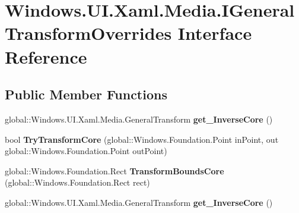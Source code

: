 \hypertarget{interface_windows_1_1_u_i_1_1_xaml_1_1_media_1_1_i_general_transform_overrides}{}\section{Windows.\+U\+I.\+Xaml.\+Media.\+I\+General\+Transform\+Overrides Interface Reference}
\label{interface_windows_1_1_u_i_1_1_xaml_1_1_media_1_1_i_general_transform_overrides}
\subsection*{Public Member Functions}
\begin{DoxyCompactItemize}
\item 
\mbox{\label{interface_windows_1_1_u_i_1_1_xaml_1_1_media_1_1_i_general_transform_overrides_a7ee385c00a216b72154039895b723310}} 
global\+::\+Windows.\+U\+I.\+Xaml.\+Media.\+General\+Transform {\bfseries get\+\_\+\+Inverse\+Core} ()
\item 
\mbox{\label{interface_windows_1_1_u_i_1_1_xaml_1_1_media_1_1_i_general_transform_overrides_a6af63aa723b299fb2551d307070b5098}} 
bool {\bfseries Try\+Transform\+Core} (global\+::\+Windows.\+Foundation.\+Point in\+Point, out global\+::\+Windows.\+Foundation.\+Point out\+Point)
\item 
\mbox{\label{interface_windows_1_1_u_i_1_1_xaml_1_1_media_1_1_i_general_transform_overrides_a20e0e564fddb97a43b3c62931dd0dafa}} 
global\+::\+Windows.\+Foundation.\+Rect {\bfseries Transform\+Bounds\+Core} (global\+::\+Windows.\+Foundation.\+Rect rect)
\item 
\mbox{\label{interface_windows_1_1_u_i_1_1_xaml_1_1_media_1_1_i_general_transform_overrides_a7ee385c00a216b72154039895b723310}} 
global\+::\+Windows.\+U\+I.\+Xaml.\+Media.\+General\+Transform {\bfseries get\+\_\+\+Inverse\+Core} ()
\item 
\mbox{\label{interface_windows_1_1_u_i_1_1_xaml_1_1_media_1_1_i_general_transform_overrides_a6af63aa723b299fb2551d307070b5098}} 

\end{DoxyCompactItemize}
